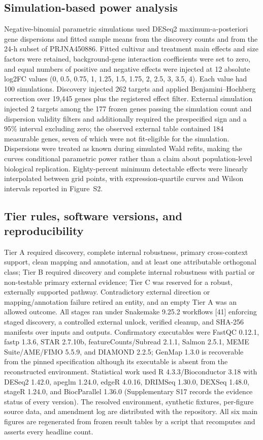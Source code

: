 \documentclass[11pt]{article}
\begin{document}
\subsection{Simulation-based power analysis}

Negative-binomial parametric simulations used DESeq2 maximum-a-posteriori gene dispersions and fitted sample means from the discovery counts and from the 24-h subset of PRJNA450886. Fitted cultivar and treatment main effects and size factors were retained, background-gene interaction coefficients were set to zero, and equal numbers of positive and negative effects were injected at 12 absolute log2FC values (0, 0.5, 0.75, 1, 1.25, 1.5, 1.75, 2, 2.5, 3, 3.5, 4). Each value had 100 simulations. Discovery injected 262 targets and applied Benjamini--Hochberg correction over 19,445 genes plus the registered effect filter. External simulation injected 2 targets among the 177 frozen genes passing the simulation count and dispersion validity filters and additionally required the prespecified sign and a 95\% interval excluding zero; the observed external table contained 184 measurable genes, seven of which were not fit-eligible for the simulation. Dispersions were treated as known during simulated Wald refits, making the curves conditional parametric power rather than a claim about population-level biological replication. Eighty-percent minimum detectable effects were linearly interpolated between grid points, with expression-quartile curves and Wilson intervals reported in Figure~S2.

\subsection{Tier rules, software versions, and reproducibility}

Tier A required discovery, complete internal robustness, primary cross-context support, clean mapping and annotation, and at least one attributable orthogonal class; Tier B required discovery and complete internal robustness with partial or non-testable primary external evidence; Tier C was reserved for a robust, externally supported pathway. Contradictory external direction or mapping/annotation failure retired an entity, and an empty Tier A was an allowed outcome. All stages ran under Snakemake 9.25.2 workflows [41] enforcing staged discovery, a controlled external unlock, verified cleanup, and SHA-256 manifests over inputs and outputs. Confirmatory executables were FastQC 0.12.1, fastp 1.3.6, STAR 2.7.10b, featureCounts/Subread 2.1.1, Salmon 2.5.1, MEME Suite/AME/FIMO 5.5.9, and DIAMOND 2.2.5; GenMap 1.3.0 is recoverable from the pinned specification although its executable is absent from the reconstructed environment. Statistical work used R 4.3.3/Bioconductor 3.18 with DESeq2 1.42.0, apeglm 1.24.0, edgeR 4.0.16, DRIMSeq 1.30.0, DEXSeq 1.48.0, stageR 1.24.0, and BiocParallel 1.36.0 (Supplementary S17 records the evidence status of every version). The resolved environment, synthetic fixtures, per-figure source data, and amendment log are distributed with the repository. All six main figures are regenerated from frozen result tables by a script that recomputes and asserts every headline count.
\end{document}

